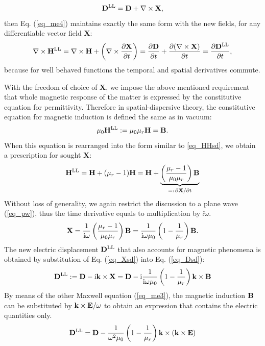 \begin{equation} {\mathbf{D}^\text{LL}}  = \mathbf{D}  + \nabla\times \mathbf{X}, \label{eq_Dsd}\end{equation}
then Eq. (\ref{eq_me4}) maintains exactly the same form with the new fields, for any differentiable vector field $\mathbf{X}$:
\begin{equation} \nabla \times {\mathbf{H}^\text{LL}} = \nabla \times \mathbf{H} + \left(\nabla\times \frac{\partial\mathbf{X}}{\partial t}\right) = \frac{\partial \mathbf{D}}{\partial t}+ \frac{\partial(\nabla\times \mathbf{X})}{\partial t} =  \frac{\partial {\mathbf{D}^\text{LL}}} {\partial t}, \label{eq_me4sd} \end{equation}
because for well behaved functions the temporal and spatial derivatives commute.

With the freedom of choice of $\mathbf{X}$, we impose the above mentioned requirement that whole magnetic response of the matter is expressed by the constitutive equation for permittivity. Therefore in spatial-dispersive theory, the constitutive equation %
for magnetic induction is defined the same as in vacuum:
\begin{equation} \mu_0 {\mathbf{H}^\text{LL}} := \mu_0 \mu_r \mathbf{H} = \mathbf{B}. \label{eq_mu_sd}\end{equation}
When this equation is rearranged into the form similar to \ref{eq_HHsd}, we obtain a prescription for sought $\mathbf{X}$: 
$$ {\mathbf{H}^\text{LL}} = \mathbf{H} + (\mu_r -1)\mathbf{H} = \mathbf{H} + \underbrace{\left(\frac{\mu_r-1}{\mu_0\mu_r}\right)\mathbf{B}}_{=:\,\partial\mathbf{X}/\partial t}$$
Without loss of generality, we again restrict the discussion to a plane wave (\ref{eq_pw}), thus the time derivative equals to multiplication by $\ii\omega$.
\begin{equation} \mathbf{X} = \frac{1}{{\mathrm i}\omega}\left(\frac{\mu_r-1}{\mu_0\mu_r}\right)\mathbf{B} = \frac{1}{{\mathrm i}\omega\mu_0}\left(1 - \frac{1}{\mu_r}\right)\mathbf{B}. \label{eq_Xsd}\end{equation}
The new electric displacement ${\mathbf{D}^\text{LL}}$ that also accounts for magnetic phenomena is obtained by substitution of Eq. (\ref{eq_Xsd}) into Eq. (\ref{eq_Dsd}):
\begin{equation} {\mathbf{D}^\text{LL}} := \mathbf{D} - {\mathrm i}{\mathbf{k}}\times \mathbf{X} =  \mathbf{D} - {\mathrm i}  \frac{1}{{\mathrm i}\omega\mu_0}\left(1 - \frac{1}{\mu_r}\right) {\mathbf{k}}\times \mathbf{B}  \label{eq_Dsd2}\end{equation}
By means of the other Maxwell equation (\ref{eq_me3}), the magnetic induction $\mathbf{B}$ can be substituted by ${\mathbf{k}}\times\mathbf{E} / \omega$ to obtain an expression that contains the electric quantities only.
\begin{equation} {\mathbf{D}^\text{LL}} = \mathbf{D} - \frac{1}{\omega^2 \mu_0}\left(1 - \frac{1}{\mu_r}\right) {\mathbf{k}}\times({\mathbf{k}}\times \mathbf{E})  \label{eq_Dsd3}\end{equation}
